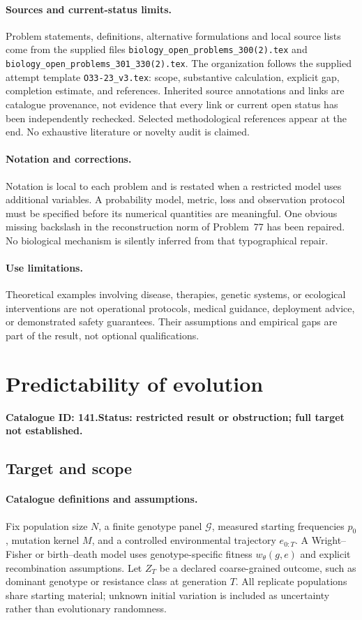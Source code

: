\documentclass[11pt]{article}
\begin{document}
\paragraph{Sources and current-status limits.}
Problem statements, definitions, alternative formulations and local source lists
come from the supplied files
\texttt{biology\_open\_problems\_300(2).tex} and
\texttt{biology\_open\_problems\_301\_330(2).tex}.
The organization follows the supplied attempt template
\texttt{O33-23\_v3.tex}: scope, substantive calculation, explicit gap,
completion estimate, and references. Inherited source annotations and links are
catalogue provenance, not evidence that every link or current open status has
been independently rechecked. Selected methodological references appear at the
end. No exhaustive literature or novelty audit is claimed.

\paragraph{Notation and corrections.}
Notation is local to each problem and is restated when a restricted model uses
additional variables. A probability model, metric, loss and observation protocol
must be specified before its numerical quantities are meaningful. One obvious
missing backslash in the reconstruction norm of Problem~77 has been repaired.
No biological mechanism is silently inferred from that typographical repair.

\paragraph{Use limitations.}
Theoretical examples involving disease, therapies, genetic systems, or ecological
interventions are not operational protocols, medical guidance, deployment advice,
or demonstrated safety guarantees. Their assumptions and empirical gaps are part
of the result, not optional qualifications.

\setcounter{section}{140}
\section{Predictability of evolution}
\label{prob:141}
\noindent\textbf{Catalogue ID: 141.}\quad \textbf{Status: restricted result or obstruction; full target not established.}
\subsection{Target and scope}
\paragraph{Catalogue definitions and assumptions.}
Fix population size $N$, a finite genotype panel $\mathcal G$, measured starting frequencies $p_0$, mutation kernel $M$, and a controlled environmental trajectory $e_{0:T}$. A Wright--Fisher or birth--death model uses genotype-specific fitness $w_\theta(g,e)$ and explicit recombination assumptions. Let $Z_T$ be a declared coarse-grained outcome, such as dominant genotype or resistance class at generation $T$. All replicate populations share starting material; unknown initial variation is included as uncertainty rather than evolutionary randomness.
\end{document}
